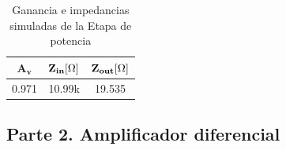 \begin{enumerate}
        \begin{table}[H]
          \centering
          \begin{tabular}{|c|c|c|}
            \hline
            $\mathbf{A_v}$ & $\mathbf{Z_{in}[\ohm]}$ & $\mathbf{Z_{out} [\ohm]}$ \\ \hline
            0.971          & 10.99k                  & 19.535                    \\ \hline
          \end{tabular}
          \caption{Ganancia e impedancias simuladas de la Etapa de potencia}
          \label{tab:dinamico_ep_sim}
        \end{table}


\end{enumerate}

\subsection{Parte 2. Amplificador diferencial}

